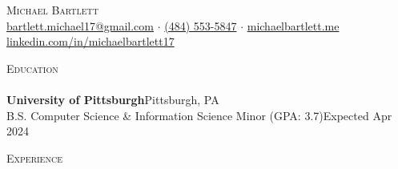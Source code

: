 \documentclass[letterpaper]{article}
\newcommand{\lineunder} {
    \vspace*{-8pt} \\
    \hspace*{-18pt} \hrulefill \\
}
\newcommand{\header} [1] {
    {\hspace*{-18pt}\vspace*{6pt} \textsc{#1}}
    \vspace*{-6pt} \lineunder
}
\begin{document}
\vspace*{-40pt}



\vspace*{-10pt}
\begin{center}
    {\fontsize{17.28pt}{20pt}\selectfont \scshape {Michael Bartlett}}\\
    \href{mailto:bartlett.michael17@gmail.com}{bartlett.michael17@gmail.com} $\cdot$ \href{tel:4845535847}{(484) 553-5847} $\cdot$ \href{http://michaelbartlett.me}{michaelbartlett.me} \href{https://www.linkedin.com/in/michaelbartlett17/}{linkedin.com/in/michaelbartlett17} \\
\end{center}

\header{Education}
\textbf{University of Pittsburgh}\hfill Pittsburgh, PA\\
B.S. Computer Science \& Information Science Minor (GPA: 3.7)\hfill Expected Apr 2024\\
\vspace{2mm}

\header{Experience}
\vspace{1mm}
\end{document}
